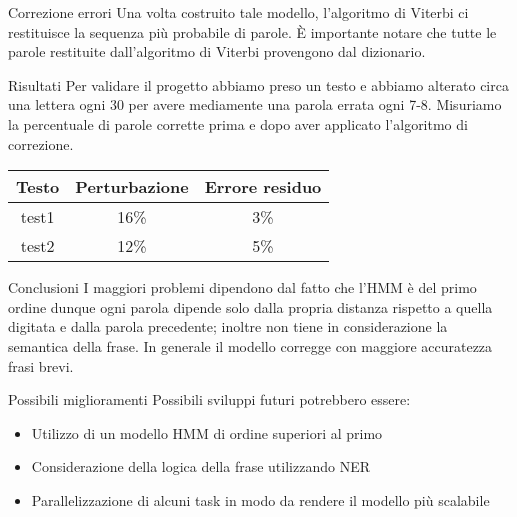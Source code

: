 \documentclass{beamer}
\begin{document}
\begin{frame}{Correzione errori}
 Una volta costruito tale modello, l'algoritmo di Viterbi ci restituisce la sequenza più probabile di parole. È importante notare che tutte le parole 
restituite dall'algoritmo di Viterbi provengono dal dizionario.
\end{frame}

\begin{frame}{Risultati}
 Per validare il progetto abbiamo preso un testo e abbiamo alterato circa una lettera ogni 30 per avere mediamente una parola errata ogni 7-8. 
Misuriamo la percentuale di parole corrette prima e dopo aver applicato l'algoritmo di correzione.\\
\vspace{0.5cm}
 
 \centering
 \begin{tabular}{|c|c|c|}
 \hline
  \textbf{Testo} & \textbf{Perturbazione} & \textbf{Errore residuo}\\
 \hline
 	test1 & 16\% &  3\% \\
 \hline 
    test2 & 12\% & 5\%\\
 \hline
 \end{tabular}
\end{frame}

\begin{frame}{Conclusioni}
  I maggiori problemi dipendono dal fatto che l'HMM è del primo ordine dunque ogni parola dipende solo dalla propria distanza rispetto a quella 
digitata 
  e dalla parola precedente; inoltre non tiene in considerazione la semantica della frase. In generale il modello corregge con maggiore accuratezza 
frasi
  brevi.
\end{frame}
\begin{frame}{Possibili miglioramenti}
	Possibili sviluppi futuri potrebbero essere:
    \begin{itemize}
    	\item Utilizzo di un modello HMM di ordine superiori al primo
        \item Considerazione della logica della frase utilizzando NER
        \item Parallelizzazione di alcuni task in modo da rendere il modello più scalabile
    \end{itemize}
\end{frame}
\end{document}
